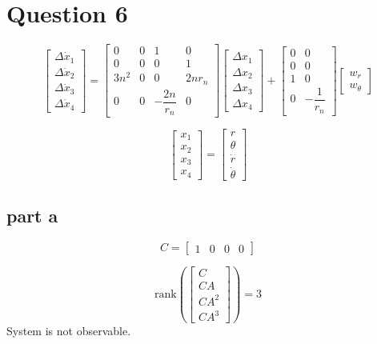 \section{Question 6}
$$
\begin{bmatrix}
    \Delta \dot x_1 \\
    \Delta \dot x_2 \\
    \Delta \dot x_3 \\
    \Delta \dot x_4
\end{bmatrix} = \begin{bmatrix}
    0 & 0 & 1 & 0 \\
    0 & 0 & 0 & 1 \\
    3n^2 & 0 & 0 & 2nr_n \\
    0 & 0 & -\dfrac{2n}{r_n} & 0
\end{bmatrix} \begin{bmatrix}
    \Delta x_1 \\
    \Delta x_2 \\
    \Delta x_3 \\
    \Delta x_4
\end{bmatrix} + \begin{bmatrix}
    0 & 0\\
    0 & 0\\
    1 & 0\\
    0 & -\dfrac{1}{r_n}
\end{bmatrix} \begin{bmatrix}
    w_r\\
    w_{\theta}
\end{bmatrix}
$$

$$
\begin{bmatrix}
     x_1 \\
     x_2 \\
     x_3 \\
     x_4
\end{bmatrix} = \begin{bmatrix}
    r \\
    \theta \\
    \dot r \\
    \dot \theta
\end{bmatrix}
$$

\subsection{part a}

$$
C = \begin{bmatrix}
    1 & 0 & 0 & 0
\end{bmatrix}
$$

$$
\text{rank}\left(\begin{bmatrix}
    C \\
    CA \\
    CA^2 \\
    CA^3
\end{bmatrix}\right) = 3
$$
System is not observable.